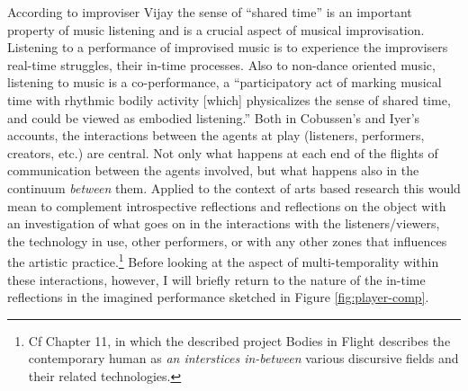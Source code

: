 According to improviser Vijay \citeauthor{iyer08} the sense of ``shared time'' is an important property of music listening and is a crucial aspect of musical improvisation. Listening to a performance of improvised music is to experience the improvisers real-time struggles, their in-time processes. Also to non-dance oriented music, listening to music is a co-performance, a ``participatory act of marking musical time with rhythmic bodily activity [which] physicalizes the sense of shared time, and could be viewed as embodied listening.'' \citep[276]{iyer08} Both in Cobussen's and Iyer's accounts, the interactions between the agents at play (listeners, performers, creators, etc.) are central. Not only what happens at each end of the flights of communication between the agents involved, but what happens also in the continuum \emph{between} them. Applied to the context of arts based research this would mean to complement introspective reflections and reflections on the object with an investigation of what goes on in the interactions with the listeners/viewers, the technology in use, other performers, or with any other zones that influences the artistic practice.\footnote{Cf Chapter 11, in which the described project Bodies in Flight describes the contemporary human as \emph{an interstices in-between} various discursive fields and their related
technologies.} %
Before looking at the aspect of multi-temporality within these interactions, however, I will briefly return to the nature of the in-time reflections in the imagined performance sketched in Figure \ref{fig:player-comp}.

